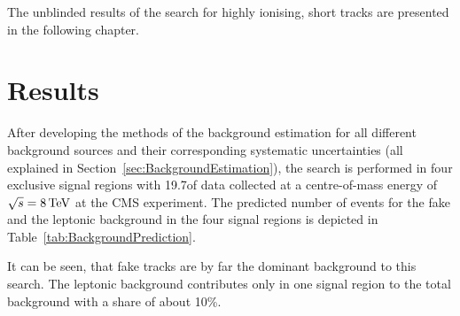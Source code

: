 The unblinded results of the search for highly ionising, short tracks are presented in the following chapter.
\FloatBarrier
\chapter{Results}
\label{sec:Results}

After developing the methods of the background estimation for all different background sources and their corresponding systematic uncertainties (all explained in Section~\ref{sec:BackgroundEstimation}), 
the search is performed in four exclusive signal regions with 19.7\fbinv of data collected at a centre-of-mass energy of $\sqrt{s} = 8\,\text{Te}\kern-0.06667em\text{V}$ at the CMS experiment.
The predicted number of events for the fake and the leptonic background in the four signal regions is depicted in Table~\ref{tab:BackgroundPrediction}.
\renewcommand{\arraystretch}{1.5}
\begin{table}[!t]
\centering
\caption{Background prediction in the four exclusive signal regions for the fake and the leptonic background.}
\label{tab:BackgroundPrediction}
\end{table}
It can be seen, that fake tracks are by far the dominant background to this search.
The leptonic background contributes only in one signal region to the total background with a share of about 10\%.

